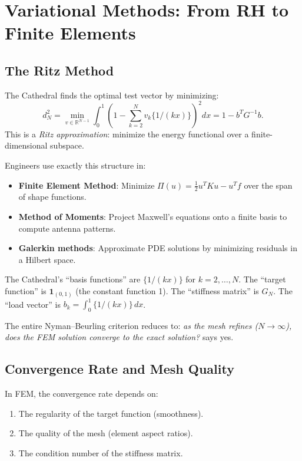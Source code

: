 \documentclass[11pt,a4paper]{article}
\begin{document}
\section{Variational Methods: From RH to Finite Elements}
\label{sec:fem}

\subsection{The Ritz Method}

The Cathedral finds the optimal test vector by minimizing:
\[
  d_N^2 = \min_{v \in \mathbb{R}^{N-1}}
  \int_0^1 \left(1 - \sum_{k=2}^N v_k \{1/(kx)\}\right)^2 dx
  = 1 - b^T G^{-1} b.
\]
This is a \emph{Ritz approximation}: minimize the energy functional
over a finite-dimensional subspace.

Engineers use exactly this structure in:

\begin{itemize}
  \item \textbf{Finite Element Method}: Minimize
    $\Pi(u) = \frac{1}{2} u^T K u - u^T f$ over the span of shape
    functions.
  \item \textbf{Method of Moments}: Project Maxwell's equations
    onto a finite basis to compute antenna patterns.
  \item \textbf{Galerkin methods}: Approximate PDE solutions by
    minimizing residuals in a Hilbert space.
\end{itemize}

The Cathedral's ``basis functions'' are $\{1/(kx)\}$ for
$k = 2, \ldots, N$. The ``target function'' is $\mathbf{1}_{(0,1)}$
(the constant function 1). The ``stiffness matrix'' is $G_N$. The
``load vector'' is $b_k = \int_0^1 \{1/(kx)\}\,dx$.

The entire Nyman--Beurling criterion reduces to: \emph{as the mesh
refines ($N \to \infty$), does the FEM solution converge to the
exact solution?} \RH{} says yes.

\subsection{Convergence Rate and Mesh Quality}

In FEM, the convergence rate depends on:
\begin{enumerate}
  \item The regularity of the target function (smoothness).
  \item The quality of the mesh (element aspect ratios).
  \item The condition number of the stiffness matrix.
\end{enumerate}
\end{document}
